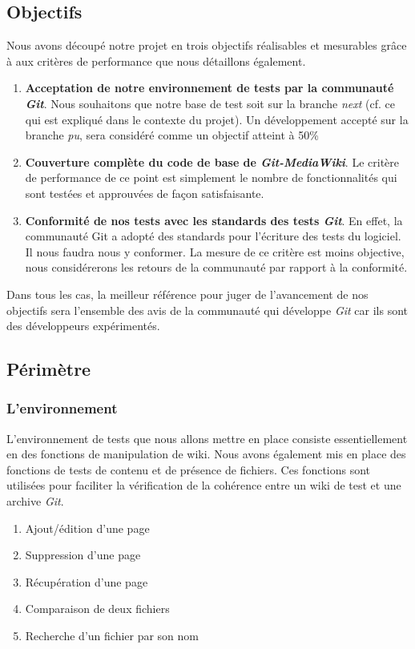 \documentclass[11pt]{article}
\begin{document}
\subsection{Objectifs}
Nous avons découpé notre projet en trois objectifs réalisables et mesurables grâce à aux critères de performance que nous détaillons également.
\begin{enumerate}
\item \textbf{Acceptation de notre environnement de tests par la communauté \textit{Git}}. Nous souhaitons que notre base de test soit sur la branche \textit{next} (cf. ce qui est expliqué dans le contexte du projet). Un développement accepté sur la branche \textit{pu}, sera considéré comme un objectif atteint à 50\%
\item \textbf{Couverture complète du code de base de \textit{Git-MediaWiki}}. Le critère de performance de ce point est simplement le nombre de fonctionnalités qui sont testées et approuvées de façon satisfaisante.
\item \textbf{Conformité de nos tests avec les standards des tests \textit{Git}}. En effet, la communauté Git a adopté des standards pour l'écriture des tests du logiciel. Il nous faudra nous y conformer. La mesure de ce critère est moins objective, nous considérerons les retours de la communauté par rapport à la conformité.
\end{enumerate}
Dans tous les cas, la meilleur référence pour juger de l'avancement de nos objectifs sera l'ensemble des avis de la communauté qui développe \textit{Git} car ils sont des développeurs expérimentés.\\

\subsection{Périmètre}
\subsubsection{L'environnement}
L'environnement de tests que nous allons mettre en place consiste essentiellement en des fonctions de manipulation de wiki. Nous avons également mis en place des fonctions de tests de contenu et de présence de fichiers. Ces fonctions sont utilisées pour faciliter la vérification de la cohérence entre un wiki de test et une archive \textit{Git}.
\begin{enumerate}
\item Ajout/édition d'une page
\item Suppression d'une page
\item Récupération d'une page
\item Comparaison de deux fichiers
\item Recherche d'un fichier par son nom
\end{enumerate}
\end{document}

